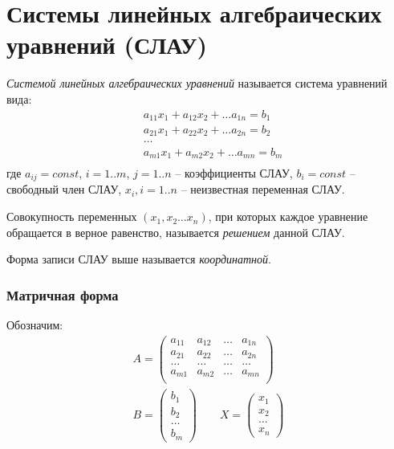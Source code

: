 \section{Системы линейных алгебраических уравнений (СЛАУ)}

\begin{definition}
  \textit{Системой линейных алгебраических уравнений} называется система уравнений вида:
  \begin{align*}
    &a_{11} x_1  + a_{12} x_2 + \ldots a_{1n} = b_1 \\
    &a_{21} x_1  + a_{22} x_2 + \ldots a_{2n} = b_2 \\
    &\ldots \\
    &a_{m1} x_1  + a_{m2} x_2 + \ldots a_{mn} = b_m \\
  \end{align*}
  где $a_{ij} = const$, $i=1..m$, $j=1..n$ -- коэффициенты СЛАУ, $b_i = const$ -- свободный член СЛАУ,  $x_{i}, i=1..n$ -- неизвестная переменная СЛАУ.
\end{definition}

\begin{definition}
  Совокупность переменных $(x_1, x_2 \ldots x_{n})$, при которых каждое уравнение обращается в верное равенство, называется \textit{решением} данной СЛАУ. 
\end{definition}

Форма записи СЛАУ выше называется \textit{координатной}. 

\subsubsection*{Матричная форма}

Обозначим:
\begin{gather*}
  A = \left( 
\begin{matrix}
  a_{11} & a_{12} & \ldots & a_{1n} \\
  a_{21} & a_{22} & \ldots & a_{2n} \\
  \ldots & \ldots & \ldots & \ldots \\
  a_{m1} & a_{m2} & \ldots & a_{mn} \\
\end{matrix}
  \right) \\
  B = \left( 
    \begin{matrix}
      b_1 \\
      b_2 \\
      \ldots \\
      b_m
    \end{matrix}
  \right) \qquad
  X = \left( 
  \begin{matrix}
    x_1 \\
    x_2 \\
    \ldots \\
    x_n
  \end{matrix}
  \right) 
\end{gather*}

